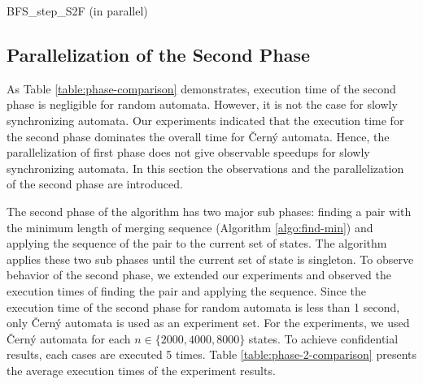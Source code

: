 \documentclass[12pt]{article}
\begin{document}
\begin{algorithm}[ht]
	\label{algo:BFS-step-S2F-Parallel}
	\caption{BFS\_step\_S2F (in parallel)}
	
	
		{
		}
\end{algorithm}


\subsection{Parallelization of the Second Phase}
\label{sec:second-phase-parallelization}

As Table \ref{table:phase-comparison} demonstrates, execution time of the second phase is negligible for random automata. However, it is not the case for slowly synchronizing automata. Our experiments indicated that the execution time for the second phase dominates the overall time for \v{C}ern\'y automata. Hence, the parallelization of first phase does not give observable speedups for slowly synchronizing automata. In this section the observations and the parallelization of the second phase are introduced.

The second phase of the algorithm has two major sub phases: finding a pair with the minimum length of merging sequence (Algorithm \ref{algo:find-min}) and applying the sequence of the pair to the current set of states. The algorithm applies these two sub phases until the current set of state is singleton. To observe behavior of the second phase, we extended our experiments and observed the execution times of finding the pair and applying the sequence. Since the execution time of the second phase for random automata is less than 1 second, only \v{C}ern\'y automata is used as an experiment set. For the experiments, we used \v{C}ern\'y automata for each $n \in \{2000, 4000, 8000\}$ states. To achieve confidential results, each cases are executed 5 times. Table \ref{table:phase-2-comparison} presents the average execution times of the experiment results.
\end{document}
